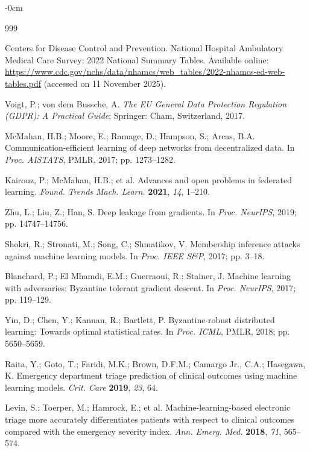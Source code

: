 \documentclass[journal,article,submit,pdftex,moreauthors]{Definitions/mdpi}
\begin{document}
\begin{adjustwidth}{-\extralength}{0cm}


\begin{thebibliography}{999}

Centers for Disease Control and Prevention. National Hospital Ambulatory Medical Care Survey: 2022 National Summary Tables. Available online: \url{https://www.cdc.gov/nchs/data/nhamcs/web_tables/2022-nhamcs-ed-web-tables.pdf} (accessed on 11 November 2025).

Voigt, P.; von dem Bussche, A. \textit{The EU General Data Protection Regulation (GDPR): A Practical Guide}; Springer: Cham, Switzerland, 2017.

McMahan, H.B.; Moore, E.; Ramage, D.; Hampson, S.; Arcas, B.A. Communication-efficient learning of deep networks from decentralized data. In \textit{Proc. AISTATS}, PMLR, 2017; pp. 1273--1282.

Kairouz, P.; McMahan, H.B.; et al. Advances and open problems in federated learning. \textit{Found. Trends Mach. Learn.} \textbf{2021}, \textit{14}, 1--210.

Zhu, L.; Liu, Z.; Han, S. Deep leakage from gradients. In \textit{Proc. NeurIPS}, 2019; pp. 14747--14756.

Shokri, R.; Stronati, M.; Song, C.; Shmatikov, V. Membership inference attacks against machine learning models. In \textit{Proc. IEEE S\&P}, 2017; pp. 3--18.

Blanchard, P.; El Mhamdi, E.M.; Guerraoui, R.; Stainer, J. Machine learning with adversaries: Byzantine tolerant gradient descent. In \textit{Proc. NeurIPS}, 2017; pp. 119--129.

Yin, D.; Chen, Y.; Kannan, R.; Bartlett, P. Byzantine-robust distributed learning: Towards optimal statistical rates. In \textit{Proc. ICML}, PMLR, 2018; pp. 5650--5659.

Raita, Y.; Goto, T.; Faridi, M.K.; Brown, D.F.M.; Camargo Jr., C.A.; Hasegawa, K. Emergency department triage prediction of clinical outcomes using machine learning models. \textit{Crit. Care} \textbf{2019}, \textit{23}, 64.

Levin, S.; Toerper, M.; Hamrock, E.; et al. Machine-learning-based electronic triage more accurately differentiates patients with respect to clinical outcomes compared with the emergency severity index. \textit{Ann. Emerg. Med.} \textbf{2018}, \textit{71}, 565--574.


\end{thebibliography}
\end{adjustwidth}
\end{document}

